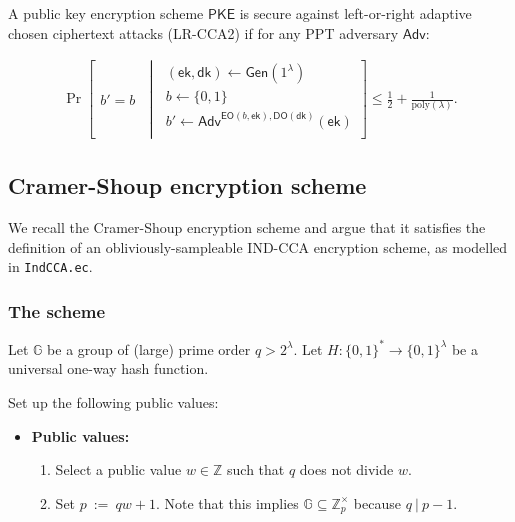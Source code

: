 \documentclass[11pt,letterpaper]{article}
\theoremstyle{plain} %
\theoremstyle{definition} %
\theoremstyle{remark} %
\newcommand{\code}[1]{\texttt{#1}} %
\newcommand{\eqdef}{\ {:=} \ }
\newcommand{\SecParam}{\lambda}
\newcommand{\PKE}{\mathsf{PKE}}
\newcommand{\Gen}{\mathsf{Gen}}
\newcommand{\EncKey}{\mathsf{ek}}
\newcommand{\DecKey}{\mathsf{dk}}
\newcommand{\GuessBit}{b'}
\newcommand{\ChallengerBit}{b}
\newcommand{\EncOracle}{\mathsf{EO}}
\newcommand{\DecOracle}{\mathsf{DO}}
\newcommand{\Adversary}{{\mathsf{Adv}}} %
\newcommand{\pST}{\; \middle| \;}
\newcommand{\poly}{\mathrm{poly}}
\newcommand{\Bits}{\{0,1\}}
\newcommand{\Integers}{\mathbb{Z}}
\newcommand{\Group}{\mathbb{G}}
\newcommand{\GrpOrd}{q}
\newcommand{\Hash}{H}
\begin{document}
A public key encryption scheme $\PKE$ is secure against left-or-right adaptive chosen ciphertext attacks (LR-CCA2) if for any PPT adversary $\Adversary$:

\begin{align*}
	\Pr \left[
	\begin{array}{c}
		\GuessBit = \ChallengerBit
	\end{array}
	\pST
	\begin{array}{r}
		(\EncKey, \DecKey) \gets \Gen(1^{\SecParam})\\
		\ChallengerBit \gets \Bits\\
		\GuessBit \gets \Adversary^{\EncOracle(\ChallengerBit,\EncKey), \DecOracle(\DecKey)}(\EncKey)\\
	\end{array}
	\right] \leq \frac{1}{2} + \frac{1}{\poly(\SecParam)}.
\end{align*}

\subsection{Cramer-Shoup encryption scheme}
\label{sec:cramer-shoup}
We recall the Cramer-Shoup encryption scheme \cite{CramerS98} and argue that it satisfies the definition of an obliviously-sampleable IND-CCA encryption scheme, as modelled in \code{IndCCA.ec}.

\subsubsection{The scheme}
\label{sec:cramer-shoup-scheme}

Let $\Group$ be a group of (large) prime order $\GrpOrd > 2^{\SecParam}$. Let $\Hash \colon \Bits^{*} \to \Bits^{\SecParam}$ be a universal one-way hash function.


\newcommand{\GrpEltG}{g}
\newcommand{\MultGrpOrd}{p}
\newcommand{\MultGrp}{\Integers^{\times}_{\MultGrpOrd}}
\newcommand{\OrdW}{w}
\newcommand{\RandStr}{\mu}
\newcommand{\OblivEltGen}{\mathsf{OblivEltGen}}
\newcommand{\Inv}[1]{{#1}^{-1}}
\newcommand{\OblivEltInv}{\Inv{\mathsf{OblivEltGen}}}
Set up the following public values:
\begin{itemize}
\item[] \textbf{Public values:}
\begin{enumerate}[nolistsep]
    \item Select a public value $\OrdW \in \Integers$ such that $\GrpOrd$ does not divide $\OrdW$.
    \item Set $\MultGrpOrd \eqdef \GrpOrd \OrdW + 1$. Note that this implies $\Group \subseteq \MultGrp$ because $\GrpOrd \:|\: \MultGrpOrd - 1$.
\end{enumerate}
\end{itemize}
\end{document}

